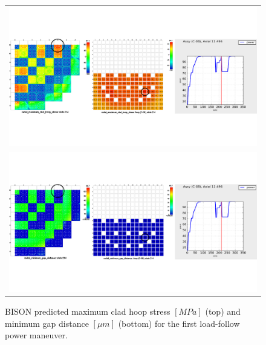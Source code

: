 \documentclass[edeposit,fullpage,11pt]{uiucthesis2009}
\begin{document}
\begin{landscape}
\begin{figure}[h]
\begin{tabular}{c}
\includegraphics[trim={0 4cm 0 4cm},clip,width=\linewidth]{./Figures/bison_res/PR1_MCHS.pdf} \\
\includegraphics[trim={0 4cm 0 4cm},clip,width=\linewidth]{./Figures/bison_res/PR1_MGD.pdf} \\
\end{tabular}
\caption{BISON predicted maximum clad hoop stress $[MPa]$ (top) and minimum gap distance $[ \mu m]$ (bottom) for the first load-follow power maneuver.}
\label{fig:bison_PR1}
\end{figure}
\end{landscape}
\end{document}
